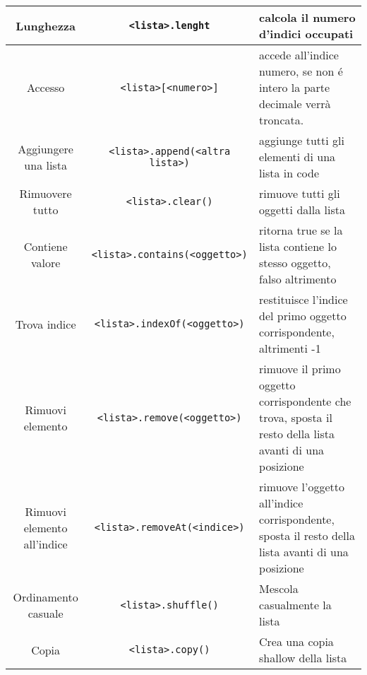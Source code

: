 \begin{center}
\begin{tabular}{| c | c | p{5cm} |}
    \hline 
    Lunghezza & \lstinline|<lista>.lenght| & calcola il numero d'indici occupati \\
    \hline
    Accesso & \lstinline|<lista>[<numero>]| & accede all'indice numero, se non é intero la parte decimale verrà
     troncata. \\
    \hline
    Aggiungere una lista & \lstinline|<lista>.append(<altra lista>)| & aggiunge tutti gli elementi di una lista in code \\
    \hline
    Rimuovere tutto & \lstinline|<lista>.clear()|& rimuove tutti gli oggetti dalla lista\\
    \hline
    Contiene valore & \lstinline|<lista>.contains(<oggetto>)| & ritorna true se la lista contiene lo stesso 
    oggetto, falso altrimento \\ 
    \hline
    Trova indice & \lstinline|<lista>.indexOf(<oggetto>)|& restituisce l'indice del primo oggetto corrispondente,
    altrimenti -1 \\
    \hline
    Rimuovi elemento & \lstinline|<lista>.remove(<oggetto>)|& rimuove il primo oggetto corrispondente che trova,
    sposta il resto della lista avanti di una posizione \\
    \hline    
    Rimuovi elemento all'indice & \lstinline|<lista>.removeAt(<indice>)|& rimuove l'oggetto all'indice corrispondente,
    sposta il resto della lista avanti di una posizione \\
    \hline    
    Ordinamento casuale & \lstinline|<lista>.shuffle()| & Mescola casualmente la lista \\
    \hline
    Copia & \lstinline|<lista>.copy()| & Crea una copia shallow della lista \\
    \hline
\end{tabular}
\end{center}

